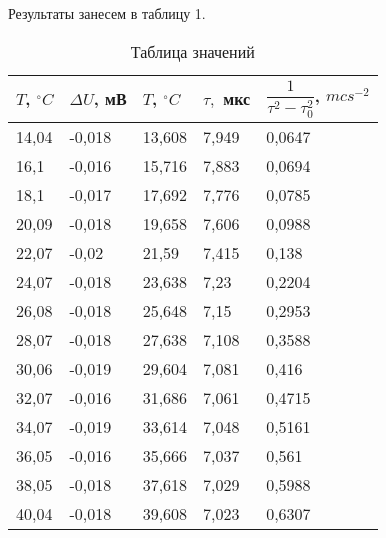 \documentclass[a4paper,13pt]{article}
\begin{document}
Результаты занесем в таблицу 1.

\begin{table}[]
    \centering
    \caption{Таблица значений}
    \begin{tabular}{|l|l|l|l|l|}
        \hline
    $ T $, $ ^\circ C $ &  $ \varDelta  U $, мВ & $ T $, $ ^\circ C$ & $ \tau, $ мкс &  $ \dfrac{1}{\tau^{2} - \tau_0^{2}} $, $ mcs^{-2} $   \\ \hline
    14,04 & -0,018 & 13,608 & 7,949 & 0,0647   \\ \hline
    16,1  & -0,016 & 15,716 & 7,883 & 0,0694   \\ \hline
    18,1  & -0,017 & 17,692 & 7,776 & 0,0785   \\ \hline
    20,09 & -0,018 & 19,658 & 7,606 & 0,0988  \\ \hline
    22,07 & -0,02  & 21,59  & 7,415 & 0,138    \\ \hline
    24,07 & -0,018 & 23,638 & 7,23  & 0,2204   \\ \hline
    26,08 & -0,018 & 25,648 & 7,15  & 0,2953   \\ \hline
    28,07 & -0,018 & 27,638 & 7,108 & 0,3588   \\ \hline
    30,06 & -0,019 & 29,604 & 7,081 & 0,416    \\ \hline
    32,07 & -0,016 & 31,686 & 7,061 & 0,4715   \\ \hline
    34,07 & -0,019 & 33,614 & 7,048 & 0,5161   \\ \hline
    36,05 & -0,016 & 35,666 & 7,037 & 0,561    \\ \hline
    38,05 & -0,018 & 37,618 & 7,029 & 0,5988   \\ \hline
    40,04 & -0,018 & 39,608 & 7,023 & 0,6307   \\ \hline
    \end{tabular}
    \end{table}
\end{document}
